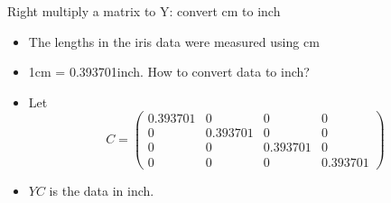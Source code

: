 \documentclass[
  ignorenonframetext,
]{beamer}
\providecommand{\tightlist}{%
  \setlength{\itemsep}{0pt}\setlength{\parskip}{0pt}}
\begin{document}
\begin{frame}{Right multiply a matrix to Y: convert cm to inch}
\protect\hypertarget{right-multiply-a-matrix-to-y-convert-cm-to-inch}{}
\begin{itemize}
\tightlist
\item
  The lengths in the iris data were measured using cm
\item
  1cm = 0.393701inch. How to convert data to inch?
\item
  Let \[C=\begin{pmatrix} 
  0.393701 & 0 & 0 & 0\\
  0 & 0.393701 & 0 & 0\\
  0 & 0 & 0.393701 & 0\\
  0 & 0 & 0 & 0.393701
  \end{pmatrix}\]
\item
  \(YC\) is the data in inch.
\end{itemize}
\end{frame}
\end{document}
